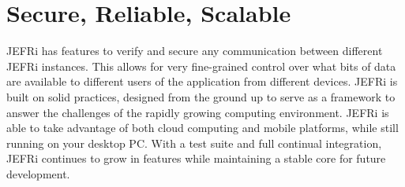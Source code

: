 \documentclass{article}
\begin{document}
\section{Secure, Reliable, Scalable}
JEFRi has features to verify and secure any communication between different
JEFRi instances. This allows for very fine-grained control over what bits of data
are available to different users of the application from different devices.
JEFRi is built on solid practices, designed from the ground up to serve as a
framework to answer the challenges of the rapidly growing computing environment.
JEFRi is able to take advantage of both cloud computing and mobile platforms,
while still running on your desktop PC. With a test suite and full continual
integration, JEFRi continues to grow in features while maintaining a stable core
for future development.
\end{document}
